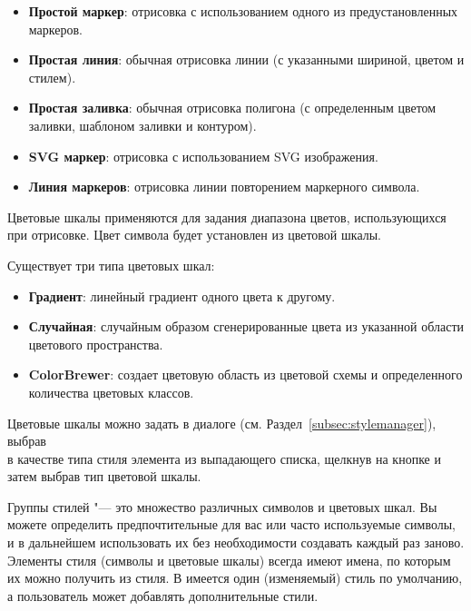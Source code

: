
\begin{itemize}[label=--]
\item \textbf{Простой маркер}: отрисовка с использованием одного из
предустановленных маркеров.
\item \textbf{Простая линия}: обычная отрисовка линии (с указанными
шириной, цветом и стилем).
\item \textbf{Простая заливка}: обычная отрисовка полигона (с определенным
цветом заливки, шаблоном заливки и контуром).
\item \textbf{SVG маркер}: отрисовка с использованием SVG изображения.
\item \textbf{Линия маркеров}: отрисовка линии повторением маркерного символа.
\end{itemize}


Цветовые шкалы применяются для задания диапазона цветов,
использующихся при отрисовке. Цвет символа будет установлен
из цветовой шкалы.

Существует три типа цветовых шкал:

\begin{itemize}[label=--]
\item \textbf{Градиент}: линейный градиент одного цвета к другому.
\item \textbf{Случайная}: случайным образом сгенерированные цвета из
указанной области цветового пространства.
\item \textbf{ColorBrewer}: создает цветовую область из цветовой схемы и
определенного количества цветовых классов.
\end{itemize}

Цветовые шкалы можно задать в диалоге 
(см. Раздел~\ref{subsec:stylemanager}), выбрав \\
 в качестве типа стиля
 элемента из выпадающего списка, щелкнув на кнопке 
 и затем выбрав тип цветовой шкалы.


Группы стилей "--- это множество различных символов и цветовых шкал. Вы
можете определить предпочтительные для вас или часто используемые символы,
и в дальнейшем использовать их без необходимости создавать каждый раз заново.
Элементы стиля (символы и цветовые шкалы) всегда имеют имена, по которым
их можно получить из стиля. В \qg имеется один (изменяемый) стиль по
умолчанию, а пользователь может добавлять дополнительные стили.

